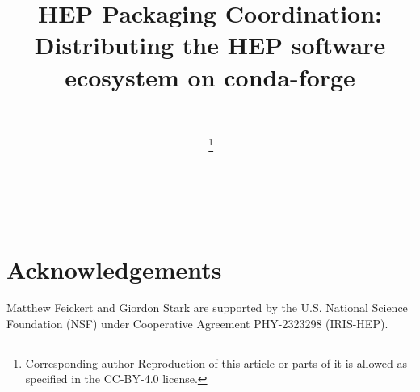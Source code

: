 \documentclass{latex/webofc}
\begin{document}
%
\title{HEP Packaging Coordination: Distributing the HEP software ecosystem on conda-forge}

\author{ \, \and
  \,\fnsep\thanks{Corresponding author 
Reproduction of this article or parts of it is allowed as specified in the CC-BY-4.0 license.} \and
  \, \and
  \,
}


\abstract{%
 
}
%
\maketitle
%







\section{Acknowledgements}\label{sec:acknowledgements}

Matthew Feickert and Giordon Stark are supported by the U.S. National Science Foundation (NSF) under Cooperative Agreement PHY-2323298 (IRIS-HEP).

\clearpage

\end{document}
